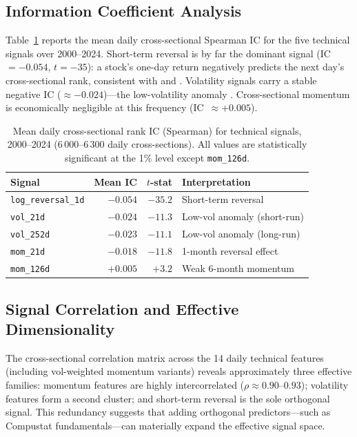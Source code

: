 \documentclass[11pt,a4paper]{article}
\begin{document}
\subsection{Information Coefficient Analysis}
\label{sec:ic}

Table~\ref{tab:daily_ic} reports the mean daily cross-sectional Spearman IC for
the five technical signals over 2000--2024. Short-term reversal is by far the
dominant signal (IC~$={-}0.054$, $t={-}35$): a stock's one-day return negatively
predicts the next day's cross-sectional rank, consistent with
\citet{jegadeesh1990} and \citet{lehmann1990}. Volatility signals carry a
stable negative IC ($\approx{-}0.024$)---the low-volatility anomaly
\citep{baker2011}. Cross-sectional momentum is economically negligible at this
frequency (IC~$\approx +0.005$).

\begin{table}[h]
\centering\small
\caption{Mean daily cross-sectional rank IC (Spearman) for technical signals,
2000--2024 (6\,000--6\,300 daily cross-sections). All values are statistically
significant at the 1\% level except \texttt{mom\_126d}.}
\label{tab:daily_ic}
\begin{tabular}{lrrl}
\toprule
Signal & Mean IC & $t$-stat & Interpretation \\
\midrule
\texttt{log\_reversal\_1d}  & $-0.054$ & $-35.2$ & Short-term reversal \\
\texttt{vol\_21d}           & $-0.024$ & $-11.3$ & Low-vol anomaly (short-run) \\
\texttt{vol\_252d}          & $-0.023$ & $-11.1$ & Low-vol anomaly (long-run) \\
\texttt{mom\_21d}           & $-0.018$ & $-11.8$ & 1-month reversal effect \\
\texttt{mom\_126d}          & $+0.005$ & $+3.2$  & Weak 6-month momentum \\
\bottomrule
\end{tabular}
\end{table}

\subsection{Signal Correlation and Effective Dimensionality}
\label{sec:correlation}

The cross-sectional correlation matrix across the 14 daily technical features
(including vol-weighted momentum variants) reveals approximately three effective
families: momentum features are highly intercorrelated ($\rho \approx 0.90$--$0.93$);
volatility features form a second cluster; and short-term reversal is the sole
orthogonal signal. This redundancy suggests that adding orthogonal predictors---such
as Compustat fundamentals---can materially expand the effective signal space.
\end{document}

